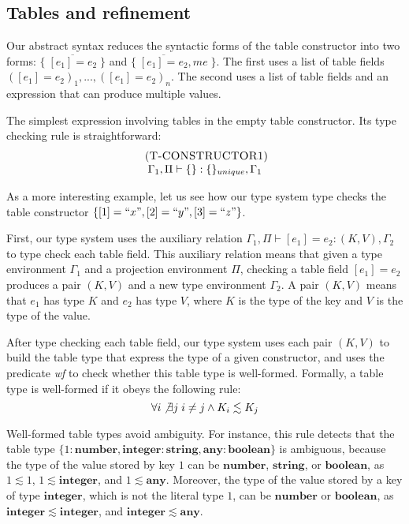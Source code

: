 \documentclass{sigplanconf}
\newcommand{\Any}{\mathbf{any}}
\newcommand{\Boolean}{\mathbf{boolean}}
\newcommand{\Integer}{\mathbf{integer}}
\newcommand{\Number}{\mathbf{number}}
\newcommand{\String}{\mathbf{string}}
\newcommand{\mylabel}[1]{\; (\textsc{#1})}
\newcommand{\env}{\Gamma}
\newcommand{\penv}{\Pi}
\begin{document}
\subsection{Tables and refinement}
\label{sec:tables}

Our abstract syntax reduces the syntactic forms of the table constructor
into two forms: $\{\;\overline{[e_{1}] = e_{2}}\;\}$ and
$\{\;\overline{[e_{1}] = e_{2}},me\;\}$.
The first uses a list of table fields $([e_{1}] = e_{2})_{1}, ..., ([e_{1}] = e_{2})_{n}$.
The second uses a list of table fields and an expression that can
produce multiple values.

The simplest expression involving tables in the empty table constructor.
Its type checking rule is straightforward:
\[
\begin{array}{c}
\mylabel{T-CONSTRUCTOR1}\\
\env_{1}, \penv \vdash \{\}:\{\}_{unique}, \env_{1}
\end{array}
\]

As a more interesting example, let us see how our type system type checks
the table constructor $\{ [1] = ``x", [2] = ``y", [3] = ``z" \}$.

First, our type system uses the auxiliary relation
$\env_{1}, \penv \vdash [e_{1}] = e_{2} : (K,V), \env_{2}$ to type check each
table field.
This auxiliary relation means that given a type environment $\env_{1}$
and a projection environment $\penv$, checking a table field $[e_{1}] = e_{2}$
produces a pair $(K,V)$ and a new type environment $\env_{2}$.
A pair $(K,V)$ means that $e_{1}$ has type $K$ and $e_{2}$ has type $V$,
where $K$ is the type of the key and $V$ is the type of the value.

After type checking each table field, our type system uses each pair $(K,V)$
to build the table type that express the type of a given constructor, and
uses the predicate \emph{wf} to check whether this table type is well-formed.
Formally, a table type is well-formed if it obeys the following rule:
\[
\forall i \not\exists j \; i \not= j \wedge K_{i} \lesssim K_{j}
\]

Well-formed table types avoid ambiguity.
For instance, this rule detects that the table type
$\{1:\Number, \Integer:\String, \Any:\Boolean\}$ is ambiguous,
because the type of the value stored by key $1$ can be
$\Number$, $\String$, or $\Boolean$, as $1 \lesssim 1$,
$1 \lesssim \Integer$, and $1 \lesssim \Any$.
Moreover, the type of the value stored by a key of type $\Integer$,
which is not the literal type $1$, can be $\Number$ or $\Boolean$,
as $\Integer \lesssim \Integer$, and $\Integer \lesssim \Any$.
\end{document}
